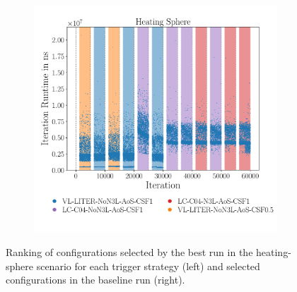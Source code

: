 \begin{figure}[htpb]
\begin{subfigure}{0.5\textwidth}
	\end{subfigure}%
	\begin{subfigure}{0.5\textwidth}
		\centering
		\includegraphics[width=\textwidth]{./Figures/plots/heating-sphere_configs_static.pdf}
		\vspace*{-1.075cm}
	\end{subfigure}
	\caption{Ranking of configurations selected by the best run in the heating-sphere scenario for each trigger strategy (left) and selected configurations in the baseline run (right).}
	\label{fig:hs_optimality}
\end{figure}

